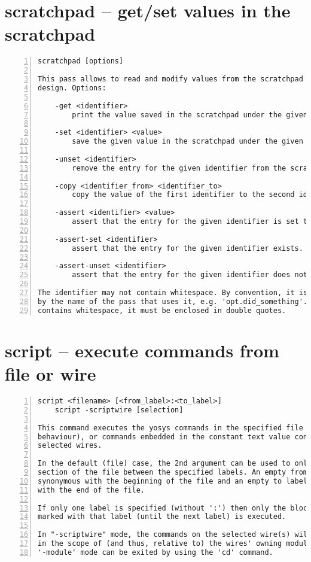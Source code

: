 \section{scratchpad -- get/set values in the scratchpad}
\label{cmd:scratchpad}
\begin{lstlisting}[numbers=left,frame=single]
    scratchpad [options]

This pass allows to read and modify values from the scratchpad of the current
design. Options:

    -get <identifier>
        print the value saved in the scratchpad under the given identifier.

    -set <identifier> <value>
        save the given value in the scratchpad under the given identifier.

    -unset <identifier>
        remove the entry for the given identifier from the scratchpad.

    -copy <identifier_from> <identifier_to>
        copy the value of the first identifier to the second identifier.

    -assert <identifier> <value>
        assert that the entry for the given identifier is set to the given value.

    -assert-set <identifier>
        assert that the entry for the given identifier exists.

    -assert-unset <identifier>
        assert that the entry for the given identifier does not exist.

The identifier may not contain whitespace. By convention, it is usually prefixed
by the name of the pass that uses it, e.g. 'opt.did_something'. If the value
contains whitespace, it must be enclosed in double quotes.
\end{lstlisting}

\section{script -- execute commands from file or wire}
\label{cmd:script}
\begin{lstlisting}[numbers=left,frame=single]
    script <filename> [<from_label>:<to_label>]
    script -scriptwire [selection]

This command executes the yosys commands in the specified file (default
behaviour), or commands embedded in the constant text value connected to the
selected wires.

In the default (file) case, the 2nd argument can be used to only execute the
section of the file between the specified labels. An empty from label is
synonymous with the beginning of the file and an empty to label is synonymous
with the end of the file.

If only one label is specified (without ':') then only the block
marked with that label (until the next label) is executed.

In "-scriptwire" mode, the commands on the selected wire(s) will be executed
in the scope of (and thus, relative to) the wires' owning module(s). This
'-module' mode can be exited by using the 'cd' command.
\end{lstlisting}

